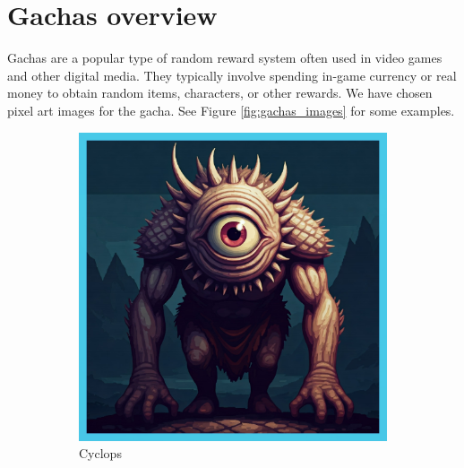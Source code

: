 \documentclass{article}
\begin{document}
\section{Gachas overview}
Gachas are a popular type of random reward system often used in video games and other digital media. They typically involve spending in-game currency or real money to obtain random items, characters, or other rewards. We have chosen pixel art images for the gacha. See Figure \ref{fig:gachas_images} for some examples.
\begin{figure}[h!]
    \centering
    \begin{subfigure}[b]{0.3\textwidth}
        \centering
        \includegraphics[width=\textwidth]{gachas/final/Cyclops (non-common).jpg}
        \caption{Cyclops}
        \label{fig:cyclops}
    \end{subfigure}
    \hfill
    \begin{subfigure}[b]{0.3\textwidth}
        \centering

\end{subfigure}
\end{figure}
\end{document}
